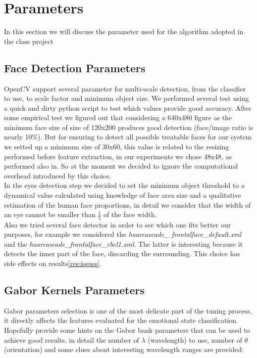 \section{Parameters}

In this section we will discuss the parameter used for the algorithm adopted in the class project

\subsection{Face Detection Parameters}

OpenCV support several parameter for multi-scale detection, from the classifier to use, to scale factor and minimum object size. We performed several test using a quick and dirty python script to test which values provide good accuracy. After some empirical test we figured out that considering a 640x480 figure as the minimum face size of size of 120x200 produces good detection (face/image ratio is nearly 10\%). But for ensuring to detect all possible treatable faces for our system we setted up a minimum size of 30x60, this value is related to the resizing performed before feature extraction, in our experiments we chose 48x48, as performed also in\cite{Littlewort04dynamicsof}. So at the moment we decided to ignore the computational overhead introduced by this choice. \\

In the eyes detection step we decided to set the minimum object threshold to a dynamical value calculated using knowledge of face area size and a qualitative estimation of the human face proportions, in detail we consider that the width of an eye cannot be smaller than $\frac{1}{5}$ of the face width.\\

Also we tried several face detector in order to see which one fits better our purposes, for example we considered the \emph{haarcascade\_ frontalface\_default.xml} and the \emph{haarcascade\_frontalface\_cbcl1.xml}. The latter is interesting because it detects the inner part of the face, discarding the surrounding. This choice has side effects on results\ref{res:issues}.

\subsection{Gabor Kernels Parameters}

Gabor parameters selection is one of the most delicate part of the tuning process, it directly affects the features evaluated for the emotional state classification. Hopefully \cite{Littlewort04dynamicsof, Bartlett06fullyautomatic, Lades93distortioninvariant} provide some hints on the Gabor bank parameters that can be used to achieve good results, in detail the number of $\lambda$ (wavelength) to use, number of $\theta$ (orientation) and some clues about interesting wavelength ranges are provided:

